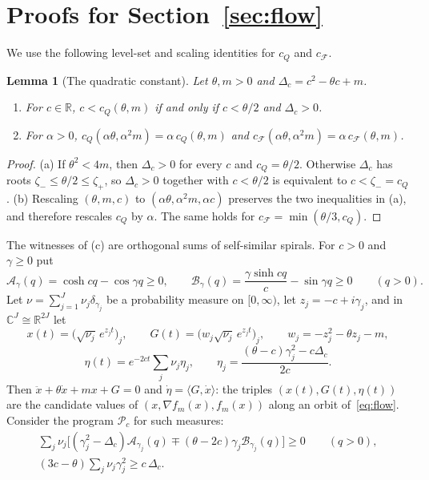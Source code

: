 \documentclass[11pt]{article}
\newtheorem{lemma}[theorem]{Lemma}
\theoremstyle{definition}
\theoremstyle{remark}
\newcommand{\R}{\mathbb R}
\newcommand{\C}{\mathbb C}
\newcommand{\cF}{\mathcal F}
\newcommand{\cA}{\mathcal A}
\newcommand{\cB}{\mathcal B}
\newcommand{\ch}{\cosh}
\newcommand{\sh}{\sinh}
\newcommand{\ip}[2]{\langle #1,#2\rangle}
\newcommand{\cQ}{c_{Q}}
\newcommand{\cFF}{c_{\cF}}
\begin{document}
\section{Proofs for Section~\ref{sec:flow}}
\label{app:flow}
%

We use the following level-set and scaling identities for \(\cQ\) and \(\cFF\).

\begin{lemma}[The quadratic constant]\label{lem:cQprop}
Let \(\theta,m>0\) and \(\Delta_c=c^2-\theta c+m\).
\begin{enumerate}[label=\textup{(\alph*)}]
\item For \(c\in\R\), \(c<\cQ(\theta,m)\) if and only if \(c<\theta/2\) and \(\Delta_c>0\).
\item For \(\alpha>0\), \(\cQ(\alpha\theta,\alpha^2m)=\alpha\,\cQ(\theta,m)\) and \(\cFF(\alpha\theta,\alpha^2m)=\alpha\,\cFF(\theta,m)\).
\end{enumerate}
\end{lemma}

\begin{proof}
(a) If \(\theta^2<4m\), then \(\Delta_c>0\) for every \(c\) and
\(\cQ=\theta/2\).  Otherwise \(\Delta_c\) has roots
\(\zeta_-\le\theta/2\le\zeta_+\), so \(\Delta_c>0\) together with
\(c<\theta/2\) is equivalent to \(c<\zeta_-=\cQ\).
(b) Rescaling \((\theta,m,c)\) to \((\alpha\theta,\alpha^2m,\alpha c)\)
preserves the two inequalities in (a), and therefore rescales \(\cQ\)
by \(\alpha\).  The same holds for \(\cFF=\min(\theta/3,\cQ)\).
\end{proof}

The witnesses of (c) are orthogonal sums of self-similar spirals.  For
\(c>0\) and \(\gamma\ge0\) put
\begin{equation}\label{eq:AB}
\cA_\gamma(q)=\ch cq-\cos\gamma q\ge0,\qquad
\cB_\gamma(q)=\frac{\gamma\sh cq}{c}-\sin\gamma q\ge0\qquad(q>0).
\end{equation}
Let \(\nu=\sum_{j=1}^J\nu_j\delta_{\gamma_j}\) be a probability measure on \([0,\infty)\), let
\(z_j=-c+i\gamma_j\), and in \(\C^J\cong\R^{2J}\) let
\begin{equation}\label{eq:cspiral}
x(t)=\bigl(\sqrt{\nu_j}\,e^{z_jt}\bigr)_j,\qquad G(t)=\bigl(w_j\sqrt{\nu_j}\,e^{z_jt}\bigr)_j,\qquad
w_j=-z_j^2-\theta z_j-m,
\end{equation}
\begin{equation}\label{eq:cvalue}
\eta(t)=e^{-2ct}\sum_j\nu_j\eta_j,\qquad \eta_j=\frac{(\theta-c)\gamma_j^2-c\Delta_c}{2c}.
\end{equation}
Then \(\ddot x+\theta\dot x+mx+G=0\) and \(\dot\eta=\ip G{\dot x}\): the triples \((x(t),G(t),\eta(t))\) are the
candidate values of \((x,\nabla f_m(x),f_m(x))\) along an orbit of~\eqref{eq:flow}.  Consider the
program \(\mathcal P_c\) for such measures:
\begin{gather}
\textstyle\sum_j\nu_j\bigl[(\gamma_j^2-\Delta_c)\cA_{\gamma_j}(q)\mp(\theta-2c)\gamma_j\cB_{\gamma_j}(q)\bigr]\ge0\qquad(q>0),\label{eq:P12}\\
\textstyle(3c-\theta)\sum_j\nu_j\gamma_j^2\ge c\,\Delta_c .\label{eq:P3}
\end{gather}
\end{document}
